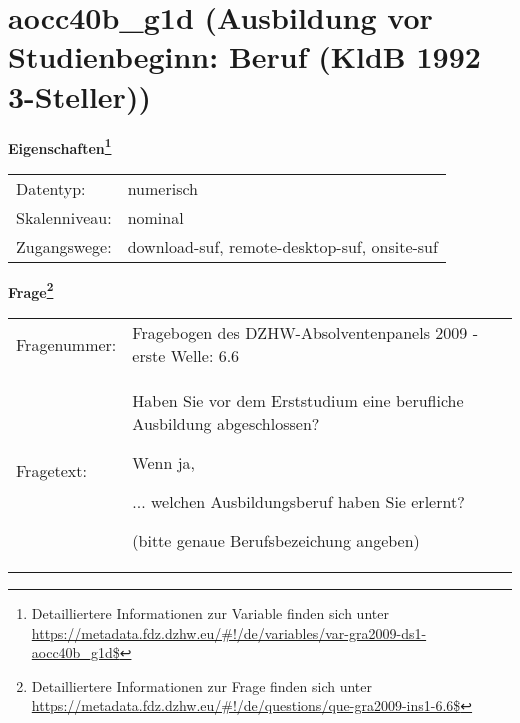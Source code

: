 
    \setcounter{footnote}{0}

    \vspace*{-1.8cm}
	\section{aocc40b\_g1d (Ausbildung vor Studienbeginn: Beruf (KldB 1992 3-Steller))}
	\label{section:aocc40b_g1d}



    \vspace*{0.5cm}
    \noindent\textbf{Eigenschaften\footnote{Detailliertere Informationen zur Variable finden sich unter
		\url{https://metadata.fdz.dzhw.eu/\#!/de/variables/var-gra2009-ds1-aocc40b_g1d$}}}\\
	\begin{tabularx}{\hsize}{@{}lX}
	Datentyp: & numerisch \\
	Skalenniveau: & nominal \\
	Zugangswege: &
	  download-suf, 
	  remote-desktop-suf, 
	  onsite-suf
 \\
    \end{tabularx}



				\vspace*{0.5cm}
                \noindent\textbf{Frage\footnote{Detailliertere Informationen zur Frage finden sich unter
		              \url{https://metadata.fdz.dzhw.eu/\#!/de/questions/que-gra2009-ins1-6.6$}}}\\
				\begin{tabularx}{\hsize}{@{}lX}
					Fragenummer: &
					  Fragebogen des DZHW-Absolventenpanels 2009 - erste Welle:
					  6.6
 \\
					Fragetext: & Haben Sie vor dem Erststudium eine berufliche Ausbildung abgeschlossen?\par  Wenn ja,\par  ... welchen Ausbildungsberuf haben Sie erlernt?\par  (bitte genaue Berufsbezeichung angeben) \\
				\end{tabularx}





